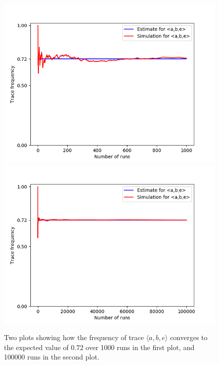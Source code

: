 \begin{figure}%
    \centering
    {{\includegraphics[width=12cm]{figures/abe1.png} }}%
    \qquad
   {{\includegraphics[width=12cm]{figures/abe100.png} }}%
    \caption{Two plots showing how the frequency of trace $\langle a,b,e \rangle$ converges to the expected value of $0.72$ over 1000 runs in the first plot, and 100000 runs in the second plot.}%
    \label{fig: abe}%
\end{figure}
%
%
%
%
%
%
%
